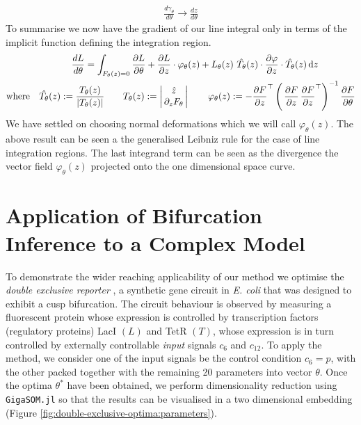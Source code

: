 \begin{align}
    \frac{d \gamma_{\theta}}{d\theta} \rightarrow \frac{d z}{d\theta}
\end{align}
To summarise we now have the gradient of our line integral only in terms of the implicit function defining the integration region.
\begin{align}
    \frac{d L}{d\theta} =\int_{F_{\theta}(z)=0}
        \frac{\partial L}{\partial\theta}+
        \frac{\partial L}{\partial z}\cdot
        \varphi_{\theta}(z)
    +L_{\theta}(z)\,\,
    \hat{T_{\theta}}(z)\cdot\frac{\partial \varphi}{\partial z}\cdot\hat{T_{\theta}}(z)
    \,\mathrm{d}z\qquad\qquad\\
    \mathrm{where}\quad
    \hat{T_{\theta}}(z):= \frac{T_{\theta}(z)}{|T_{\theta}(z)|}
    \qquad
    T_{\theta}(z):=
    \left|\begin{matrix}
        \hat{z} \\
        \,\partial_{z}F_{\theta}\,
    \end{matrix}\right|
    \qquad
    \varphi_{\theta}(z) :=
- \frac{\partial F}{\partial z}^\top
    \left(\,
        \frac{\partial F}{\partial z}\,\frac{\partial F}{\partial z}^\top
    \right)^{-1}
    \frac{\partial F}{\partial\theta}
\end{align}
We have settled on choosing normal deformations which we will call $\varphi_\theta(z)$. The above result can be seen a the generalised Leibniz rule \cite{Flanders1973DifferentiationSign} for the case of line integration regions. The last integrand term can be seen as the divergence the vector field $\varphi_\theta(z)$ projected onto the one dimensional space curve.

\clearpage

\section{Application of Bifurcation Inference to a Complex Model}
\label{appendix:double-exclusive}

To demonstrate the wider reaching applicability of our method we optimise the \emph{double exclusive reporter} \cite{Grant2020InterpretationCircuit}, a synthetic gene circuit in \emph{E. coli} that was designed to exhibit a cusp bifurcation. The circuit behaviour is observed by measuring a fluorescent protein whose expression is controlled by transcription factors (regulatory proteins) LacI $(L)$ and TetR $(T)$, whose expression is in turn controlled by externally controllable \emph{input} signals $c_{6}$ and $c_{12}$. To apply the method, we consider one of the input signals be the control condition $c_{6}=p$, with the other packed together with the remaining 20 parameters into vector $\theta$. Once the optima $\theta^*$ have been obtained, we perform dimensionality reduction using \texttt{GigaSOM.jl} \cite{Kratochvil2020GigaSOM.jl:Datasets} so that the results can be visualised in a two dimensional embedding (Figure \ref{fig:double-exclusive-optima:parameters}).

